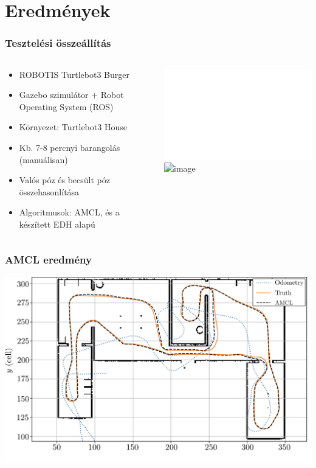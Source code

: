 \documentclass{beamer}
\begin{document}
\section{Eredmények}
\begin{frame}
    \frametitle{Tesztelési összeállítás}
    \begin{columns}
        \begin{column}{0.65\textwidth}
            \begin{itemize}
                \item<1-> ROBOTIS Turtlebot3 Burger
                \item<1-> Gazebo szimulátor + Robot Operating System (ROS)
                \item<2-> Környezet: Turtlebot3 House
                \item<3-> Kb. 7-8 percnyi barangolás (manuálisan)
                \item<4-> Valós póz és becsült póz összehasonlítása
                \item<5-> Algoritmusok: AMCL, és a készített EDH alapú
            \end{itemize}
        \end{column}
        \begin{column}{0.5\textwidth}
            \begin{center}
                \vspace{-1.5cm}
                \includegraphics<1->[width=0.8\linewidth]{_Figures/turtlebot3.pdf}
                \includegraphics<2->[width=\linewidth]{_Figures/tb3_house.png}
            \end{center}
        \end{column}
    \end{columns}
\end{frame}
\begin{frame}
    \frametitle{AMCL eredmény}
    \includegraphics[width=\linewidth]{_Figures/AMCL_crop.png}
\end{frame}
\end{document}
